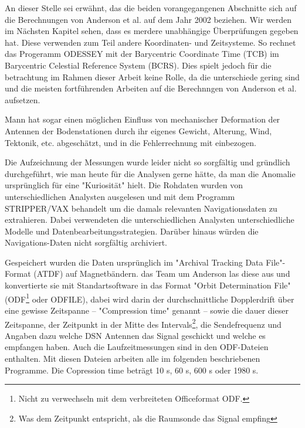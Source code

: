 An dieser Stelle sei erwähnt, das die beiden vorangegangenen Abschnitte sich auf die Berechnungen von Anderson et al. auf dem Jahr 2002 beziehen.
Wir werden im Nächsten Kapitel sehen, dass es merdere unabhängige Überprüfungen gegeben hat.
Diese verwenden zum Teil andere Koordinaten- und Zeitsysteme.
So rechnet das Progeramm ODESSEY mit der Barycentric Coordinate Time (TCB) im Barycentric Celestial Reference System (BCRS).
Dies spielt jedoch für die betrachtung im Rahmen dieser Arbeit keine Rolle, da die unterschiede gering sind und die meisten fortführenden Arbeiten auf die Berechnngen von Anderson et al. aufsetzen.	%

Mann hat sogar einen möglichen Einfluss von mechanischer Deformation der Antennen der Bodenstationen durch ihr eigenes Gewicht,
Alterung, Wind, Tektonik, etc. abgeschätzt, und in die Fehlerrechnung mit einbezogen.\cite{Dittus2006} %


Die Aufzeichnung der Messungen wurde leider nicht so sorgfältig und gründlich durchgeführt, wie man heute für die Analysen gerne hätte, da man die Anomalie ursprünglich für eine "Kuriosität" hielt.\cite{Nieto2005} Die Rohdaten wurden von unterschiedlichen Analysten ausgelesen und mit dem Programm STRIPPER/VAX behandelt um die damals relevanten Navigationsdaten zu extrahieren.\cite{Nieto2005} %
Dabei verwendeten die unterschiedlichen Analysten unterschiedliche Modelle und Datenbearbeitungsstrategien.\cite{Nieto2005}
Darüber hinaus würden die Navigations-Daten nicht sorgfältig archiviert.\cite{Nieto2005}

Gespeichert wurden die Daten ursprünglich im "Archival Tracking Data File"-Format (ATDF) auf Magnetbändern. das Team um Anderson las diese aus und konvertierte sie mit Standartsoftware in das Format "Orbit Determination File" (ODF\footnote{Nicht zu verwechseln mit dem verbreiteten Officeformat ODF.} oder ODFILE), dabei wird darin der durchschnittliche Dopplerdrift über eine gewisse Zeitspanne
– "Compression time" genannt – sowie die dauer dieser Zeitspanne, der Zeitpunkt in der Mitte des Intervals\footnote{Was dem Zeitpunkt entspricht, als die Raumsonde das Signal empfing\cite{Levy2008}}, die Sendefrequenz und
Angaben dazu welche DSN Antennen das Signal geschickt und welche es empfangen haben.\cite{Levy2008}
Auch die Laufzeitmessungen sind in den ODF-Dateien enthalten.\cite{Anderson2002}
Mit diesen Dateien arbeiten alle im folgenden beschriebenen Programme.
Die Copression time beträgt 10 s, 60 s, 600 s oder 1980 s.\cite{Anderson2002} %



